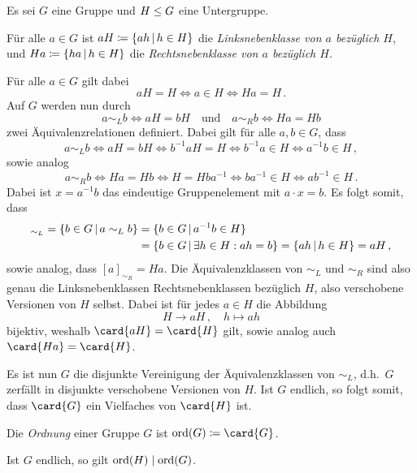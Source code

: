 Es sei $G$ eine Gruppe und $H \mathrel{\leq} G$ eine Untergruppe.

\begin{definition}
  Für alle $a \in G$ ist $aH \defined \{ ah \suchthat h \in H \}$ die \emph{Linksnebenklasse von $a$ bezüglich $H$}, und $Ha \defined \{ ha \suchthat h \in H \}$ die \emph{Rechtsnebenklasse von $a$ bezüglich $H$}.
\end{definition}

Für alle $a \in G$ gilt dabei
\[
        aH = H
  \iff  a \in H
  \iff  Ha = H \,.
\]
Auf $G$ werden nun durch
\[
        a \sim_L b
  \iff  aH = bH
  \quad\text{und}\quad
        a \sim_R b
  \iff  Ha = Hb
\]
zwei Äquivalenzrelationen definiert.
Dabei gilt für alle $a, b \in G$, dass
\[
        a \sim_L b
  \iff  aH = bH
  \iff  b^{-1} a H = H
  \iff  b^{-1} a \in H
  \iff  a^{-1} b \in H \,,
\]
sowie analog
\[
        a \sim_R b
  \iff  Ha = Hb
  \iff  H = H b a^{-1}
  \iff  b a^{-1} \in H
  \iff  a b^{-1} \in H \,.
\]
Dabei ist $x = a^{-1} b$ das eindeutige Gruppenelement mit $a \cdot x = b$.
Es folgt somit, dass
\begin{align*}
      [a]_{\sim_L}
   =  \{ b \in G \suchthat a \sim_L b \}
  &=  \{ b \in G \suchthat a^{-1} b \in H \}  \\
  &=  \{ b \in G \suchthat \exists h \in H : ah = b \}
   =  \{ ah \suchthat h \in H \}
   =  aH \,,
\end{align*}
sowie analog, dass $[a]_{\sim_R} = Ha$.
Die Äquivalenzklassen von $\sim_L$ und $\sim_R$ sind also genau die Linksnebenklassen Rechtsnebenklassen bezüglich $H$, also verschobene Versionen von $H$ selbst.
Dabei ist für jedes $a \in H$ die Abbildung
\[
          H
  \to     aH \,,
  \quad   h
  \mapsto ah
\]
bijektiv, weshalb $\card{aH} = \card{H}$ gilt, sowie analog auch $\card{Ha} = \card{H}$.

Es ist nun $G$ die disjunkte Vereinigung der Äquivalenzklassen von $\sim_L$, d.h.\ $G$ zerfällt in disjunkte verschobene Versionen von $H$.
Ist $G$ endlich, so folgt somit, dass $\card{G}$ ein Vielfaches von $\card{H}$ ist.

\begin{definition}
  Die \emph{Ordnung} einer Gruppe $G$ ist $\ord{G} \defined \card{G}$.
\end{definition}

\begin{corollary}
  Ist $G$ endlich, so gilt $\operatorname{ord}(H) \mathrel{|} \operatorname{ord}(G)$.
\end{corollary}

